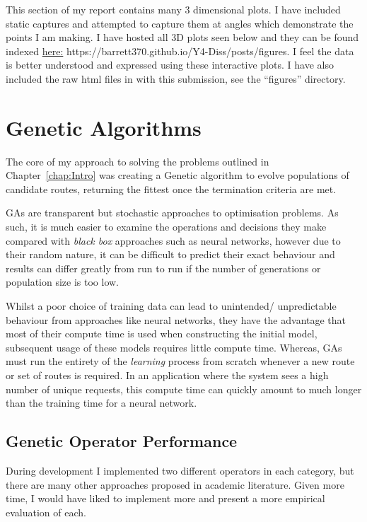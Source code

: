 This section of my report contains many 3 dimensional plots. I have included static captures and attempted to capture them at angles which demonstrate the points I am making. I have hosted all 3D plots seen below and they can be found indexed \href{https://barrett370.github.io/Y4-Diss/posts/figures}{here:} https://barrett370.github.io/Y4-Diss/posts/figures. I feel the data is better understood and expressed using these interactive plots. I have also included the raw html files in with this submission, see the ``figures'' directory.

\section{Genetic Algorithms}
\label{sec:eval:GAs}

The core of my approach to solving the problems outlined in Chapter~\ref{chap:Intro} was creating a Genetic algorithm to evolve populations of candidate routes, returning the fittest once the termination criteria are met.

GAs are transparent but stochastic approaches to optimisation problems. As such, it is much easier to examine the operations and decisions they make compared with \textit{black box} approaches such as neural networks, however due to their random nature, it can be difficult to predict their exact behaviour and results can differ greatly from run to run if the number of generations or population size is too low.

Whilst a poor choice of training data can lead to unintended/ unpredictable behaviour from approaches like neural networks, they have the advantage that most of their compute time is used when constructing the initial model, subsequent usage of these models requires little compute time. Whereas, GAs must run the entirety of the \textit{learning} process from scratch whenever a new route or set of routes is required. In an application where the system sees a high number of unique requests, this compute time can quickly amount to much longer than the training time for a neural network.

\subsection{Genetic Operator Performance}

During development I implemented two different operators in each category, but there are many other approaches proposed in academic literature. Given more time, I would have liked to implement more and present a more empirical evaluation of each.

